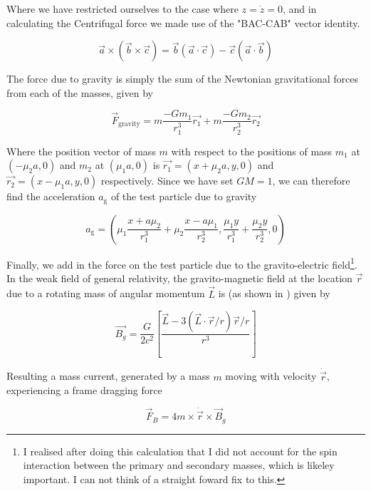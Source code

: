 \documentclass{article}
\begin{document}
Where we have restricted ourselves to the case where $z = \dot{z} = 0$, and in calculating the Centrifugal force we made use of the "BAC-CAB" vector identity.

\begin{equation}
    \vec{a} \times ( \vec{b} \times \vec{c}) = \vec{b} (\vec{a} \cdot \vec{c}) - \vec{c} (\vec{a} \cdot \vec{b})
\end{equation}

The force due to gravity is simply the sum of the Newtonian gravitational forces from each of the masses, given by 

\begin{equation}
    \vec{F}_\mathrm{gravity} = m \frac{-G m_1}{r_1^3} \vec{r_1} + m \frac{-G m_2}{r_2^3} \vec{r_2}
\end{equation}

Where the position vector of mass $m$ with respect to the positions of mass $m_1$ at $(-\mu_2 a, 0)$ and $m_2$ at $(\mu_1 a, 0)$ is $\vec{r_1} = (x+\mu_2 a, y, 0)$ and 
$\vec{r_2}=(x-\mu_1 a, y, 0)$ respectively. Since we have set $G M=1$, we can therefore find the acceleration $a_\mathrm{g}$ of the test particle due to gravity

\begin{equation}
    a_\mathrm{g} = (\mu_1 \frac{x+a \mu_2}{r_1^3} + \mu_2 \frac{x-a \mu_1}{r_2^3}, 
    \frac{\mu_1 y}{r_1^3} + \frac{\mu_2 y}{r_2^3}, 0)
\end{equation}

Finally, we add in the force on the test particle due to the gravito-electric field\footnote{I realised after doing this calculation that I did not account for the spin interaction between the primary and secondary masses, which is likeley important. I can not think of a straight foward fix to this.}. In the weak field of general relativity, the gravito-magnetic field at the location $\vec{r}$ due to a rotating mass of angular momentum $\vec{L}$ is (as shown in \cite{Moore}) given by 

\begin{equation}
    \label{eq: Gravitomagnetic field}
    \vec{B_g} = \frac{G}{2 c^2} \left[ \frac{\vec{L} - 3 \left(\vec{L} \cdot \vec{r} / r\right) \vec{r} / r}{r^3} \right]
\end{equation}

Resulting a mass current, generated by a mass $m$ moving with velocity $\dot{\vec{r}}$, experiencing a frame dragging force

\begin{equation}
    \label{eq: Force due to frame dragging in gravitomagnetism}
    \vec{F}_B = 4 m \times \dot{\vec{r}} \times \vec{B}_g
\end{equation}
\end{document}
